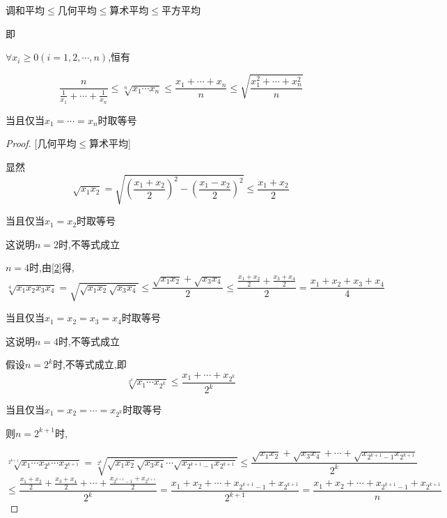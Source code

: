 \begin{theorem}[均值不等式]
    调和平均$\le$几何平均$\le$算术平均$\le$平方平均

    即

    $\forall x_i\ge 0(i=1,2,\cdots,n)$,恒有

    \begin{equation}    \label{均值不等式}
        \frac{n}{\frac{1}{x_1}+\cdots+\frac{1}{x_n}}\le \sqrt[n]{x_1\cdots x_n}\le  \frac{x_1+\cdots+x_n}{n} \le \sqrt{\frac{x_1^2+\cdots+x_n^2}{n}}
    \end{equation}

    当且仅当$x_1=\cdots=x_n$时取等号
\end{theorem}

\begin{proof}

    [几何平均$\le$算术平均]

    \vspace{4pt}

    显然
    \begin{equation}
        \sqrt{x_1x_2}=\sqrt{(\frac{x_1+x_2}{2})^2-(\frac{x_1-x_2}{2})^2}\le \frac{x_1+x_2}{2}   \label{2}
    \end{equation}

    当且仅当$x_1=x_2$时取等号

    这说明$n=2$时,不等式成立
    \vspace{6pt}

    $n=4$时,由\cref{2}得,
    \begin{equation}
        \sqrt[4]{x_1x_2x_3x_4}=\sqrt{\sqrt{x_1x_2}\sqrt{x_3x_4}}\le \frac{\sqrt{x_1x_2}+\sqrt{x_3x_4}}{2}\le \frac{\frac{x_1+x_2}{2}+\frac{x_3+x_4}{2}}{2}=\frac{x_1+x_2+x_3+x_4}{4}    \label{4递推}
    \end{equation}

    当且仅当$x_1=x_2=x_3=x_4$时取等号

    这说明$n=4$时,不等式成立
    \vspace{8pt}

    假设$n=2^k$时,不等式成立,即
    \begin{equation}
        \sqrt[2^k]{x_1\cdots x_{2^k}}\le \frac{x_1+\cdots+x_{2^k}}{2^k}
    \end{equation}

    当且仅当$x_1=x_2=\cdots = x_{2^k}$时取等号

    \vspace{8pt}

    则$n=2^{k+1}$时,

    \begin{equation*}
        \sqrt[2^{k+1}]{x_1\cdots x_{2^k}\cdots x_{2^{k+1}}}=\sqrt[2^k]{\sqrt{x_1 x_2} \sqrt{x_3 x_4} \cdots \sqrt{x_{2^{k+1}-1} x_{2^{k+1}}}}\le \frac{\sqrt{x_1 x_2}+\sqrt{x_3 x_4}+\cdots+\sqrt{x_{2^{k+1}-1} x_{2^{k+1}}}}{2^k}
    \end{equation*}
    \begin{equation}
        \le \frac{ \frac{x_1+x_2}{2} + \frac{x_3+x_4}{2} + \cdots + \frac{x_{2^{k+1}-1}+x_{2^{k+1}}}{2}}{2^k} = \frac{x_1+x_2+\cdots + x_{2^{k+1}-1}+x_{2^{k+1}}}{2^{k+1}}=\frac{x_1+x_2+\cdots + x_{2^{k+1}-1}+x_{2^{k+1}}}{n}
    \end{equation}


\end{proof}
